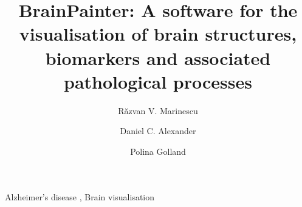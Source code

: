 \documentclass[final,5p,times,twocolumn,authoryear]{elsarticle}
\begin{document}
\begin{frontmatter}



\title{BrainPainter: A software for the visualisation of brain structures, biomarkers and associated pathological processes}




\address[ucl]{Centre for Medical Image Computing, University College London, Gower Street, London, United Kingdom, WC1E 6BT}
\address[mit]{Computer Science and Artificial Intelligence Laboratory, Massachusetts Institute of Technology, Cambridge, USA, MA 02139}


\author[ucl,mit]{R\u{a}zvan V. Marinescu}
\author[ucl]{Daniel C. Alexander}
\author[mit]{Polina Golland}





\begin{abstract}


\end{abstract}

\begin{keyword}
Alzheimer's disease \sep 
Brain visualisation
\end{keyword}

\end{frontmatter}
\end{document}
